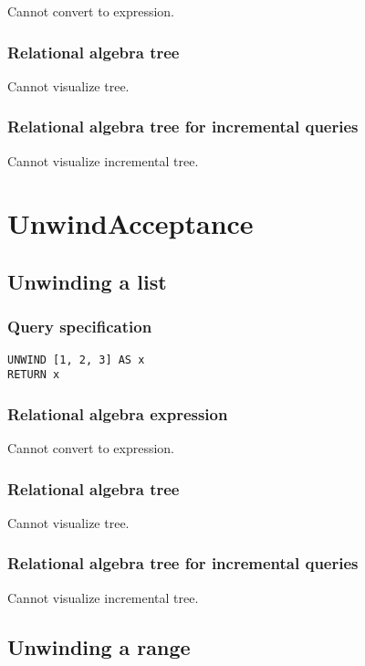 Cannot convert to expression.

\subsubsection*{Relational algebra tree}

Cannot visualize tree.

\subsubsection*{Relational algebra tree for incremental queries}

Cannot visualize incremental tree.

\section{UnwindAcceptance}

\subsection{Unwinding a list}

\subsubsection*{Query specification}

\begin{lstlisting}
UNWIND [1, 2, 3] AS x
RETURN x
\end{lstlisting}

\subsubsection*{Relational algebra expression}

Cannot convert to expression.

\subsubsection*{Relational algebra tree}

Cannot visualize tree.

\subsubsection*{Relational algebra tree for incremental queries}

Cannot visualize incremental tree.

\subsection{Unwinding a range}

